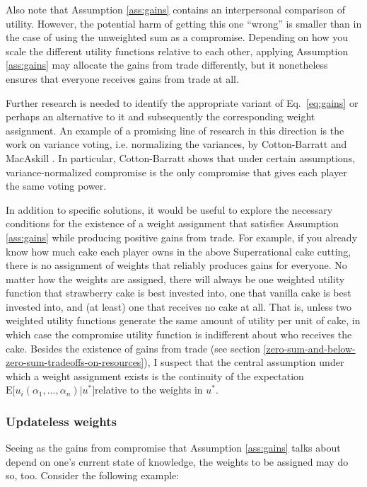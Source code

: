 Also note that Assumption \ref{ass:gains} contains an interpersonal comparison of
utility. However, the potential harm of getting this one ``wrong'' is
smaller than in the case of using the unweighted sum as a compromise.
Depending on how you scale the different utility functions relative to
each other, applying Assumption \ref{ass:gains} may allocate the gains from trade
differently, but it nonetheless ensures that everyone receives gains
from trade at all.

Further research is needed to identify the appropriate variant of Eq.~\eqref{eq:gains} or
perhaps an alternative to it and subsequently the corresponding weight
assignment. An example of a promising line of research in this direction
is the work on variance voting, i.e. normalizing the variances, by
Cotton-Barratt \parencite{Cotton-Barratt2013-ql} and
MacAskill \parencite{MacAskill2014-ca}. In particular,
Cotton-Barratt shows that under certain assumptions, variance-normalized
compromise is the only compromise that gives each player the same voting
power.

In addition to specific solutions, it would be useful to explore the
necessary conditions for the existence of a weight assignment that
satisfies Assumption \ref{ass:gains} while producing positive gains from trade. For
example, if you already know how much cake each player owns in the above
Superrational cake cutting, there is no assignment of weights that
reliably produces gains for everyone. No matter how the weights are
assigned, there will always be one weighted utility function that
strawberry cake is best invested into, one that vanilla cake is best
invested into, and (at least) one that receives no cake at all. That is,
unless two weighted utility functions generate the same amount of
utility per unit of cake, in which case the compromise utility function
is indifferent about who receives the cake. Besides the existence of
gains from trade (see section
\ref{zero-sum-and-below-zero-sum-tradeoffs-on-resources}), I suspect that the
central assumption under which a weight assignment exists is the
continuity of the expectation
\(\mathrm{E}\lbrack u_{i}(\alpha_{1},...,\alpha_{n})|u^{*}\rbrack\)relative to
the weights in \(u^{*}\).

\hypertarget{updateless-weights}{\subsubsection{Updateless
weights}\label{updateless-weights}}

Seeing as the gains from compromise that Assumption \ref{ass:gains} talks about depend
on one's current state of knowledge, the weights to be assigned may do
so, too. Consider the following example:

